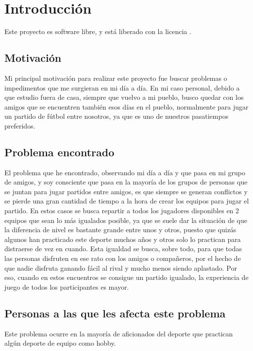 \chapter{Introducción}

Este proyecto es software libre, y está liberado con la licencia \cite{gplv3}.

\section{Motivación}

Mi principal motivación para realizar este proyecto fue buscar problemas o impedimentos que me surgieran en mi día a día.
En mi caso personal, debido a que estudio fuera de casa, siempre que vuelvo a mi pueblo, busco quedar con los amigos que se encuentren también esos días en el pueblo, 
normalmente para jugar un partido de fútbol entre nosotros, ya que es uno de nuestros pasatiempos preferidos.\\

\section{Problema encontrado}

El problema que he encontrado, observando mi día a día y que pasa en mi grupo de amigos, y soy consciente que pasa en la mayoría de los grupos de personas que se juntan para jugar partidos entre amigos, 
es que siempre se generan conflictos y se pierde una gran cantidad de tiempo a la hora de crear los equipos para jugar el partido. 
En estos casos se busca repartir a todos los jugadores disponibles en 2 equipos que sean lo más igualados posible, ya que se suele dar la situación de que la diferencia de nivel es bastante grande entre unos y otros,
puesto que quizás algunos han practicado este deporte muchos años y otros solo lo practican para distraerse de vez en cuando.
Esta igualdad se busca, sobre todo, para que todas las personas disfruten en ese rato con los amigos o compañeros, por el hecho de que nadie disfruta ganando fácil al rival y mucho menos siendo aplastado. Por eso, cuando en estos encuentros se consigue
un partido igualado, la experiencia de juego de todos los participantes es mayor. 

\section{Personas a las que les afecta este problema}

Este problema ocurre en la mayoría de aficionados del deporte que practican algún deporte de equipo como hobby.

